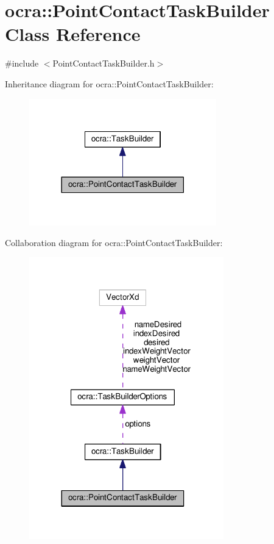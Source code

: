 \hypertarget{classocra_1_1PointContactTaskBuilder}{}\section{ocra\+:\+:Point\+Contact\+Task\+Builder Class Reference}
\label{classocra_1_1PointContactTaskBuilder}


{\ttfamily \#include $<$Point\+Contact\+Task\+Builder.\+h$>$}



Inheritance diagram for ocra\+:\+:Point\+Contact\+Task\+Builder\+:
\nopagebreak
\begin{figure}[H]
\begin{center}
\leavevmode
\includegraphics[width=230pt]{de/d67/classocra_1_1PointContactTaskBuilder__inherit__graph}
\end{center}
\end{figure}


Collaboration diagram for ocra\+:\+:Point\+Contact\+Task\+Builder\+:
\nopagebreak
\begin{figure}[H]
\begin{center}
\leavevmode
\includegraphics[width=239pt]{dc/daa/classocra_1_1PointContactTaskBuilder__coll__graph}
\end{center}
\end{figure}
